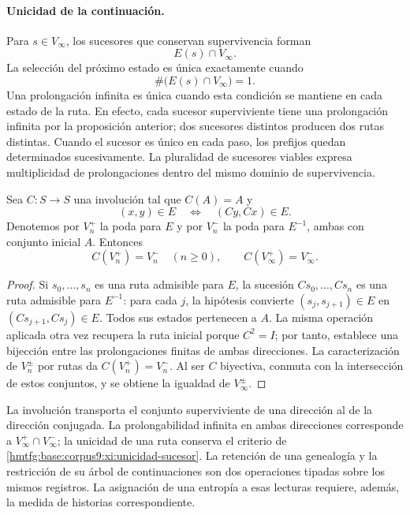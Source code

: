 \paragraph{Unicidad de la continuación.}
Para \(s\in V_\infty\), los sucesores que conservan supervivencia forman
\[
 E(s)\cap V_\infty.
\]
La selección del próximo estado es única exactamente cuando
\begin{equation}
 \#\bigl(E(s)\cap V_\infty\bigr)=1.
 \label{hmtfg:base:corpus9:xi:unicidad-sucesor}
\end{equation}
Una prolongación infinita es única cuando esta condición se mantiene
en cada estado de la ruta. En efecto, cada sucesor superviviente tiene
una prolongación infinita por la proposición anterior; dos sucesores
distintos producen dos rutas distintas. Cuando el sucesor es único en
cada paso, los prefijos quedan determinados sucesivamente.
La pluralidad de sucesores viables expresa multiplicidad de
prolongaciones dentro del mismo dominio de supervivencia.

\begin{proposition}
\label{hmtfg:base:corpus9:xi:conjugacion-supervivencia}
Sea \(C:S\to S\) una involución tal que \(C(A)=A\) y
\begin{equation}
 (x,y)\in E\quad\Longleftrightarrow\quad(Cy,Cx)\in E.
 \label{hmtfg:base:corpus9:xi:involucion-prolongaciones}
\end{equation}
Denotemos por \(V_n^+\) la poda para \(E\) y por \(V_n^-\) la poda
para \(E^{-1}\), ambas con conjunto inicial \(A\). Entonces
\[
 C(V_n^+)=V_n^-\quad(n\geq0),\qquad
 C(V_\infty^+)=V_\infty^-.
\]
\end{proposition}

\begin{proof}
Si \(s_0,\ldots,s_n\) es una ruta admisible para \(E\), la sucesión
\(Cs_0,\ldots,Cs_n\) es una ruta admisible para \(E^{-1}\):
para cada \(j\), la hipótesis convierte
\((s_j,s_{j+1})\in E\) en \((Cs_{j+1},Cs_j)\in E\).
Todos sus estados pertenecen a \(A\). La misma operación aplicada otra
vez recupera la ruta inicial porque \(C^2=I\); por tanto, establece una
bijección entre las prolongaciones finitas de ambas direcciones.
La caracterización de \(V_n^\pm\) por rutas da
\(C(V_n^+)=V_n^-\). Al ser \(C\) biyectiva, conmuta con la
intersección de estos conjuntos, y se obtiene la igualdad de
\(V_\infty^\pm\).
\end{proof}

La involución transporta el conjunto superviviente de una dirección al
de la dirección conjugada. La prolongabilidad infinita en ambas
direcciones corresponde a \(V_\infty^+\cap V_\infty^-\); la unicidad
de una ruta conserva el criterio de
\eqref{hmtfg:base:corpus9:xi:unicidad-sucesor}. La retención de una genealogía
y la restricción de su árbol de continuaciones son dos operaciones
tipadas sobre los mismos registros. La asignación de una entropía a
esas lecturas requiere, además, la medida de historias correspondiente.
